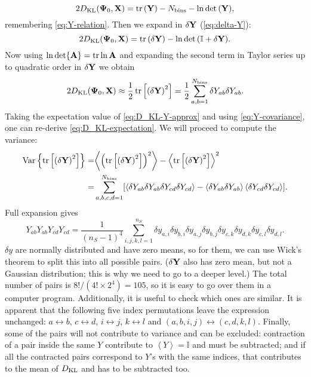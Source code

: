 \begin{equation}
2 D_{\rm KL} \Arg{{\bf \Psi}_0, {\bf X}} = \tr \Arg{\bf Y} - N_{\rm bins} - \ln \det \Arg{\bf Y},
\end{equation}
remembering \cref{eq:Y-relation}.
Then we expand in $\bf \delta Y$ (\cref{eq:delta-Y}):
\begin{equation}
2 D_{\rm KL} \Arg{{\bf \Psi}_0, {\bf X}} = \tr \Arg{\bf \delta Y} - \ln \det \Arg{\bf \mathbb I + \delta Y}.
\end{equation}
Now using $\ln \det {\bf A} = \tr \ln {\bf A}$ and expanding the second term in Taylor series up to quadratic order in $\bf \delta Y$ we obtain
\begin{equation} \label{eq:D_KL-Y-approx}
2 D_{\rm KL} \Arg{{\bf \Psi}_0, {\bf X}} \approx \frac12 \tr \Args{\Arg{\bf \delta Y}^2} = \frac12 \sum_{a,b=1}^{N_{\rm bins}} \delta Y_{ab} \delta Y_{ab}.
\end{equation}
Taking the expectation value of \cref{eq:D_KL-Y-approx} and using \cref{eq:Y-covariance}, one can re-derive \cref{eq:D_KL-expectation}. We will proceed to compute the variance:
\begin{align}
\Var \Argf{\tr \Args{\Arg{\bf \delta Y}^2}} =& \Avg{\Arg{\tr \Args{\Arg{\bf \delta Y}^2}}^2} - \Avg{\tr \Args{\Arg{\bf \delta Y}^2}}^2 \nonumber \\
=& \sum_{a,b,c,d=1}^{N_{\rm bins}} [\left\langle \delta Y_{ab} \delta Y_{ab} \delta Y_{cd} \delta Y_{cd} \right\rangle - \left\langle \delta Y_{ab} \delta Y_{ab} \right\rangle \left\langle \delta Y_{cd} \delta Y_{cd} \right\rangle].
\end{align}
Full expansion gives
\begin{equation}
Y_{ab} Y_{ab} Y_{cd} Y_{cd} = \frac1{(n_S-1)^4} \sum_{i,j,k,l=1}^{n_S} \delta y_{a,i} \delta y_{b,i} \delta y_{a,j} \delta y_{b,j} \delta y_{c,k} \delta y_{d,k} \delta y_{c,l} \delta y_{d,l}.
\end{equation}
$\delta y$ are normally distributed and have zero means, so for them, we can use Wick's theorem to split this into all possible pairs. ($\bf \delta Y$ also has zero mean, but not a Gaussian distribution; this is why we need to go to a deeper level.)
The total number of pairs is $8!/(4!\times 2^4)=105$, so it is easy to go over them in a computer program.
Additionally, it is useful to check which ones are similar.
It is apparent that the following five index permutations leave the expression unchanged: $a \leftrightarrow b$, $c \leftrightarrow d$, $i \leftrightarrow j$, $k \leftrightarrow l$ and $(a,b,i,j) \leftrightarrow (c,d,k,l)$.
Finally, some of the pairs will not contribute to variance and can be excluded: contraction of a pair inside the same $Y$ contribute to $\left\langle Y \right\rangle = \mathbb I$ and must be subtracted; and if all the contracted pairs correspond to $Y$'s with the same indices, that contributes to the mean of $D_{\rm KL}$ and has to be subtracted too.

